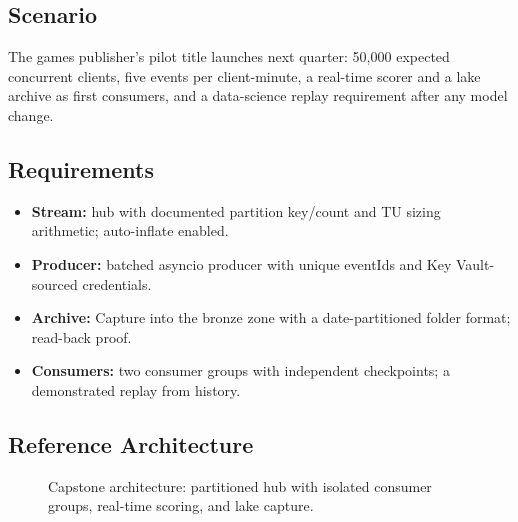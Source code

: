 \subsection*{Scenario}
The games publisher's pilot title launches next quarter: 50{,}000 expected concurrent clients, five events per client-minute, a real-time scorer and a lake archive as first consumers, and a data-science replay requirement after any model change.

\subsection*{Requirements}
\begin{itemize}
    \item \textbf{Stream:} hub with documented partition key/count and TU sizing arithmetic; auto-inflate enabled.
    \item \textbf{Producer:} batched asyncio producer with unique eventIds and Key Vault-sourced credentials.
    \item \textbf{Archive:} Capture into the bronze zone with a date-partitioned folder format; read-back proof.
    \item \textbf{Consumers:} two consumer groups with independent checkpoints; a demonstrated replay from history.
\end{itemize}

\subsection*{Reference Architecture}
\begin{figure}[H]
    \centering
    \caption{Capstone architecture: partitioned hub with isolated consumer groups, real-time scoring, and lake capture.}
    \label{fig:ch13-capstone-arch}
\end{figure}

